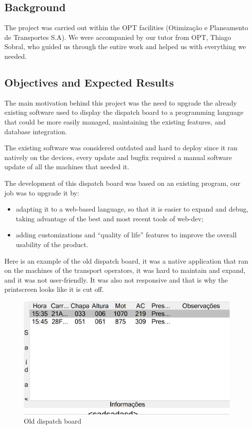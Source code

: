 \documentclass[10pt]{article}
\begin{document}
    \subsection{Background}
    The project was carried out within the OPT facilities (Otimização e Planeamento de Transportes S.A). We were accompanied by our tutor from OPT, Thiago Sobral, who guided us through the entire work and helped us with everything we needed.

    \subsection{Objectives and Expected Results}
        The main motivation behind this project was the need to upgrade the already existing software used to display the dispatch board to a programming language that could be more easily managed, maintaining the existing features, and database integration.
        
        The existing software was considered outdated and hard to deploy since it ran natively on the devices, every update and bugfix required a manual software update of all the machines that needed it.

        The development of this dispatch board was based on an existing program, our job was to upgrade it by:
        \begin{itemize}
            \item adapting it to a web-based language, so that it is easier to expand and debug, taking advantage of the best and most recent tools of web-dev;
            \item adding customizations and “quality of life” features to improve the overall usability of the product.
        \end{itemize}

        Here is an example of the old dispatch board, it was a native application that ran on the machines of the transport operators, it was hard to maintain and expand, and it was not user-friendly. It was also not responsive and that is why the printscreen looks like it is cut off.
        
        \begin{figure}[!ht]
            \centering
            \includegraphics[width=1\textwidth]{old_dispatch_board}
            \caption{Old dispatch board}
            \label{fig:old_dispatch_board}
        \end{figure}
        
\end{document}
